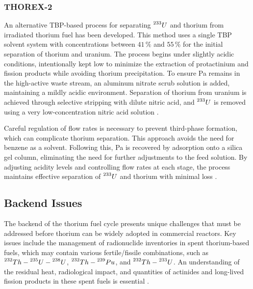 \subsubsection{THOREX-2}

An alternative TBP-based process for separating \(\prescript{233}{}{U}\) and thorium from irradiated thorium fuel has been developed. This method uses a single TBP solvent system with concentrations between \(41 \, \%\) and \(55 \, \%\) for the initial separation of thorium and uranium. The process begins under slightly acidic conditions, intentionally kept low to minimize the extraction of protactinium and fission products while avoiding thorium precipitation. To ensure Pa remains in the high-active waste stream, an aluminum nitrate scrub solution is added, maintaining a mildly acidic environment. Separation of thorium from uranium is achieved through selective stripping with dilute nitric acid, and \(\prescript{233}{}{U}\) is removed using a very low-concentration nitric acid solution \cite{fuel_cycle_book}. 

Careful regulation of flow rates is necessary to prevent third-phase formation, which can complicate thorium separation. This approach avoids the need for benzene as a solvent. Following this, Pa is recovered by adsorption onto a silica gel column, eliminating the need for further adjustments to the feed solution. By adjusting acidity levels and controlling flow rates at each stage, the process maintains effective separation of \(\prescript{233}{}{U}\) and thorium with minimal loss \cite{fuel_cycle_book}.

\subsection{Backend Issues}

The backend of the thorium fuel cycle presents unique challenges that must be addressed before thorium can be widely adopted in commercial reactors. Key issues include the management of radionuclide inventories in spent thorium-based fuels, which may contain various fertile/fissile combinations, such as \(\prescript{232}{}{Th}-\prescript{235}{}{U}-\prescript{238}{}{U}\), \(\prescript{232}{}{Th}-\prescript{239}{}{Pu}\), and \(\prescript{232}{}{Th}-\prescript{233}{}{U}\). An understanding of the residual heat, radiological impact, and quantities of actinides and long-lived fission products in these spent fuels is essential \cite{IAEA_Th_Potential}.

